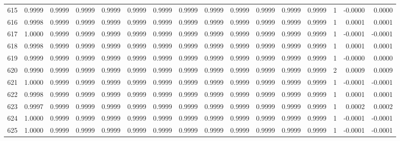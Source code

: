 \begin{tabular}{lrrrrrrrrrrrrrrr}
615 &      0.9999 &  0.9999 &  0.9999 &  0.9999 &  0.9999 &  0.9999 &  0.9999 &  0.9999 &  0.9999 &  0.9999 &   0.9999 &     0.9999 &      1 &                   -0.0000 &                     0.0000 \\
616 &      0.9998 &  0.9999 &  0.9999 &  0.9999 &  0.9999 &  0.9999 &  0.9999 &  0.9999 &  0.9999 &  0.9999 &   0.9999 &     0.9999 &      1 &                    0.0001 &                     0.0001 \\
617 &      1.0000 &  0.9999 &  0.9999 &  0.9999 &  0.9999 &  0.9999 &  0.9999 &  0.9999 &  0.9999 &  0.9999 &   0.9999 &     0.9999 &      1 &                   -0.0001 &                    -0.0001 \\
618 &      0.9998 &  0.9999 &  0.9999 &  0.9999 &  0.9999 &  0.9999 &  0.9999 &  0.9999 &  0.9999 &  0.9999 &   0.9999 &     0.9999 &      1 &                    0.0001 &                     0.0001 \\
619 &      0.9999 &  0.9999 &  0.9999 &  0.9999 &  0.9999 &  0.9999 &  0.9999 &  0.9999 &  0.9999 &  0.9999 &   0.9999 &     0.9999 &      1 &                   -0.0000 &                     0.0000 \\
620 &      0.9990 &  0.9999 &  0.9999 &  0.9999 &  0.9999 &  0.9999 &  0.9999 &  0.9999 &  0.9999 &  0.9999 &   0.9999 &     0.9999 &      2 &                    0.0009 &                     0.0009 \\
621 &      1.0000 &  0.9999 &  0.9999 &  0.9999 &  0.9999 &  0.9999 &  0.9999 &  0.9999 &  0.9999 &  0.9999 &   0.9999 &     0.9999 &      1 &                   -0.0001 &                    -0.0001 \\
622 &      0.9998 &  0.9999 &  0.9999 &  0.9999 &  0.9999 &  0.9999 &  0.9999 &  0.9999 &  0.9999 &  0.9999 &   0.9999 &     0.9999 &      1 &                    0.0001 &                     0.0001 \\
623 &      0.9997 &  0.9999 &  0.9999 &  0.9999 &  0.9999 &  0.9999 &  0.9999 &  0.9999 &  0.9999 &  0.9999 &   0.9999 &     0.9999 &      1 &                    0.0002 &                     0.0002 \\
624 &      1.0000 &  0.9999 &  0.9999 &  0.9999 &  0.9999 &  0.9999 &  0.9999 &  0.9999 &  0.9999 &  0.9999 &   0.9999 &     0.9999 &      1 &                   -0.0001 &                    -0.0001 \\
625 &      1.0000 &  0.9999 &  0.9999 &  0.9999 &  0.9999 &  0.9999 &  0.9999 &  0.9999 &  0.9999 &  0.9999 &   0.9999 &     0.9999 &      1 &                   -0.0001 &                    -0.0001 \\

\end{tabular}
